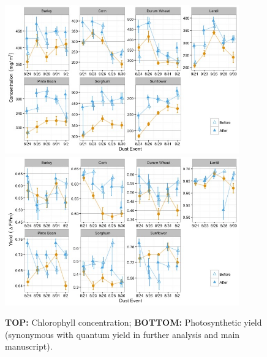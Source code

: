 \documentclass[]{scrartcl}
\begin{document}
\begin{figure}[!h]
  \centering
  \includegraphics[width=0.9\textwidth]{figures/chlorconc.jpg}\\
  \includegraphics[width=0.9\textwidth]{figures/photoact.jpg}\\
  \caption{\textbf{TOP:} Chlorophyll concentration; \textbf{BOTTOM:} Photosynthetic yield (synonymous with quantum yield in further analysis and main manuscript).   }
\end{figure}

\clearpage
\end{document}
